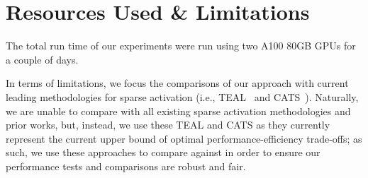 \section{Resources Used \& Limitations}
\label{sec:resources_limitations}

The total run time of our experiments were run using two A100 80GB GPUs for a couple of days. 

In terms of limitations, we focus the comparisons of our approach with current leading methodologies for sparse activation (i.e., TEAL~\citep{liu2024trainingfreeactivationsparsitylarge} and CATS~\citep{lee2024catscontextuallyawarethresholdingsparsity}). Naturally, we are unable to compare with all existing sparse activation methodologies and prior works, but, instead, we use these TEAL and CATS as they currently represent the current upper bound of optimal performance-efficiency trade-offs; as such, we use these approaches to compare against in order to ensure our performance tests and comparisons are robust and fair.


